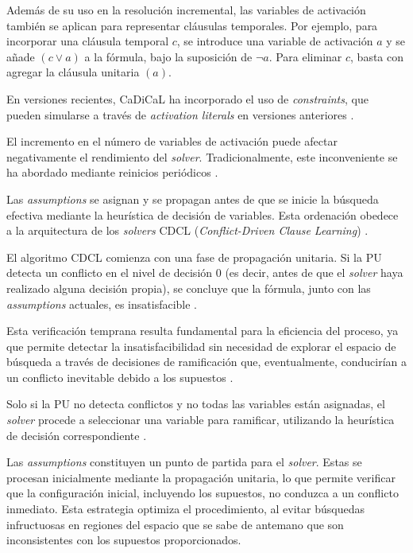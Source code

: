 Además de su uso en la resolución incremental, las variables de activación también se aplican para representar cláusulas temporales. Por ejemplo, para incorporar una cláusula temporal $c$, se introduce una variable de activación $a$ y se añade $(c \lor a)$ a la fórmula, bajo la suposición de $\neg a$. Para eliminar $c$, basta con agregar la cláusula unitaria $(a)$.

En versiones recientes, CaDiCaL ha incorporado el uso de \textit{constraints}, que pueden simularse a través de \textit{activation literals} en versiones anteriores \cite{cadical2024}.

El incremento en el número de variables de activación puede afectar negativamente el rendimiento del \textit{solver}. Tradicionalmente, este inconveniente se ha abordado mediante reinicios periódicos \cite{su2025deeply_ic3}.


Las \textit{assumptions} se asignan y se propagan antes de que se inicie la búsqueda efectiva mediante la heurística de decisión de variables. Esta ordenación obedece a la arquitectura de los \textit{solvers} CDCL (\textit{Conflict-Driven Clause Learning}) \cite{marques-silva2024cdcl}.

El algoritmo CDCL comienza con una fase de propagación unitaria. Si la PU detecta un conflicto en el nivel de decisión 0 (es decir, antes de que el \textit{solver} haya realizado alguna decisión propia), se concluye que la fórmula, junto con las \textit{assumptions} actuales, es insatisfacible \cite{sun2024autosat}.

Esta verificación temprana resulta fundamental para la eficiencia del proceso, ya que permite detectar la insatisfacibilidad sin necesidad de explorar el espacio de búsqueda a través de decisiones de ramificación que, eventualmente, conducirían a un conflicto inevitable debido a los supuestos \cite{marques-silva2024cdcl}.

Solo si la PU no detecta conflictos y no todas las variables están asignadas, el \textit{solver} procede a seleccionar una variable para ramificar, utilizando la heurística de decisión correspondiente \cite{sun2024autosat}.

Las \textit{assumptions} constituyen un punto de partida para el \textit{solver}. Estas se procesan inicialmente mediante la propagación unitaria, lo que permite verificar que la configuración inicial, incluyendo los supuestos, no conduzca a un conflicto inmediato. Esta estrategia optimiza el procedimiento, al evitar búsquedas infructuosas en regiones del espacio que se sabe de antemano que son inconsistentes con los supuestos proporcionados.

